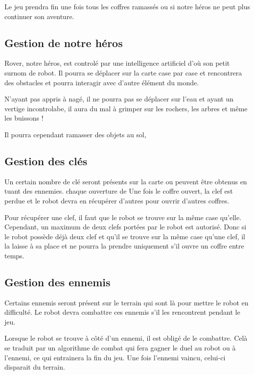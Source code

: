 \documentclass[a4paper 12pts]{article}
\begin{document}
Le jeu prendra fin une fois tous les coffres ramassés ou si notre héros ne peut plus continuer son aventure.


\subsection{Gestion de notre héros}

Rover, notre héros, est controlé par une intelligence artificiel d'où son petit surnom de robot.
Il pourra se déplacer sur la carte case par case et rencontrera des obstacles et pourra interagir avec d'autre élément du monde.

N'ayant pas appris à nagé, il ne pourra pas se déplacer sur l'eau et ayant un vertige incontrolabe, il aura du mal à grimper sur les rochers,
les arbres et même les buissons !

Il pourra cependant ramasser des objets au sol, 

\subsection{Gestion des clés}


Un certain nombre de clé seront présents sur la carte ou peuvent être obtenus en tuant des ennemies.
chaque ouverture de 
Une fois le coffre ouvert, la clef est perdue et le robot devra en récupérer d'autres pour ouvrir d'autres coffres.

Pour récupérer une clef, il faut que le robot se trouve sur la même case qu'elle. Cependant, un maximum de deux clefs portées par le robot est autorisé. Donc si le robot possède déjà deux clef et qu'il se trouve sur la même case qu'une clef, il la laisse à sa place et ne pourra la prendre uniquement s'il ouvre un coffre entre temps.

\subsection{Gestion des ennemis}
Certains ennemis seront présent sur le terrain qui sont là pour mettre le robot en difficulté. Le robot devra combattre ces ennemis s'il les rencontrent pendant le jeu.

Lorsque le robot se trouve à côté d'un ennemi, il est obligé de le combattre. Celà se traduit par un algorithme de combat qui fera gagner le duel au robot ou à l'ennemi, ce qui entrainera la fin du jeu. Une fois l'ennemi vaincu, celui-ci disparait du terrain.
\end{document}
